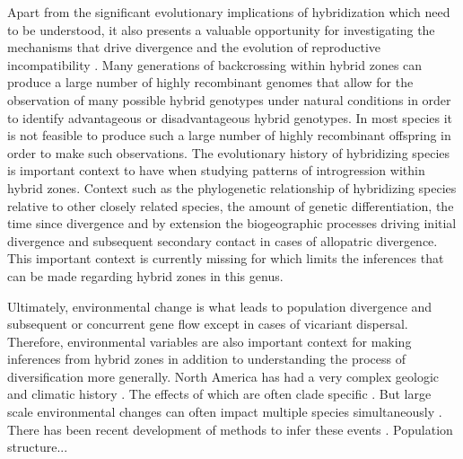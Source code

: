 Apart from the significant evolutionary implications of hybridization which 
need to be understood, it also presents a valuable opportunity for investigating 
the mechanisms that drive divergence and the evolution of reproductive
incompatibility \parencite{rieseberg1999}. 
Many generations of backcrossing within hybrid zones can produce a large number
of highly recombinant genomes that allow for the observation of many possible 
hybrid genotypes under natural conditions in order to identify advantageous or
disadvantageous hybrid genotypes. 
In most species it is not feasible to produce such a large number of highly  
recombinant offspring in order to make such observations.
The evolutionary history of hybridizing species is important context to have 
when studying patterns of introgression within hybrid zones. 
Context such as the phylogenetic relationship of hybridizing species relative to
other closely related species, the amount of genetic differentiation, 
the time since divergence and by extension the biogeographic 
processes driving initial divergence and subsequent secondary contact in cases 
of allopatric divergence.
This important context is currently missing for \anaxyrus which limits the
inferences that can be made regarding hybrid zones in this genus. 


Ultimately, environmental change is what leads to population divergence and subsequent 
or concurrent gene flow except in cases of vicariant dispersal.
Therefore, environmental variables are also important context for making 
inferences from hybrid zones in addition to understanding the process of 
diversification more generally.
North America has had a very complex geologic and climatic history \parencite{lyman2022}.
The effects of which are often clade specific \parencite{nunez2023}.
But large scale environmental changes can often impact multiple species simultaneously \parencite{oaks2019}.
There has been recent development of methods to infer these events \parencite{oaks2019,oaks2022}.
Population structure...


